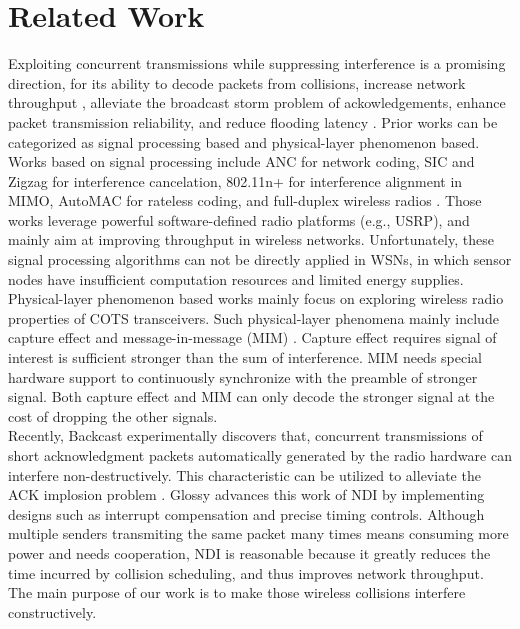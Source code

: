 \documentclass[conference]{IEEEtran}
\begin{document}
\section{Related Work}
\label{Sec_Relate}
\indent
Exploiting concurrent transmissions while suppressing interference is a promising direction, for its ability to decode packets from collisions, increase network throughput \cite{wang2010multicast,Capacity-INFOCOM12,chu2010opportunistic}, alleviate the broadcast storm problem of ackowledgements\cite{DuttaSensys10Backcast}, enhance packet transmission reliability, and reduce flooding latency \cite{ferrari11Glossy}.
Prior works can be categorized as signal processing based and physical-layer phenomenon based.\\
\indent Works based on signal processing include ANC \cite{katti2007embracing} for network coding, SIC \cite{halperin2008taking} and Zigzag \cite{gollakota2008zigzag} for interference cancelation, 802.11n+ \cite{lin2011random} for interference alignment in MIMO, AutoMAC \cite{Gudipati2012AutoMAC} for rateless coding, and full-duplex wireless radios \cite{jain2011practical}.
Those works leverage powerful software-defined radio platforms (e.g., USRP), and mainly aim at improving throughput in wireless networks.
Unfortunately, these signal processing algorithms can not be directly applied in WSNs, in which sensor nodes have insufficient computation resources and limited energy supplies.\\
\indent Physical-layer phenomenon based works mainly focus on exploring wireless radio properties of COTS transceivers.
Such physical-layer phenomena mainly include capture effect \cite{leentvaar1976captureeffect} and message-in-message (MIM) \cite{santhapuri2008message}.
Capture effect requires signal of interest is sufficient stronger than the sum of interference.
MIM needs special hardware support to continuously synchronize with the preamble of stronger signal.
Both capture effect and MIM can only decode the stronger signal at the cost of dropping the other signals.\\
\indent Recently, Backcast \cite{DuttaSensys10Backcast} experimentally discovers that, concurrent transmissions of short acknowledgment packets automatically generated by the radio hardware can interfere non-destructively.
This characteristic can be utilized to alleviate the ACK implosion problem \cite{ni1999broadcaststorm}.
Glossy \cite{ferrari11Glossy} advances this work of NDI by implementing designs such as interrupt compensation and precise timing controls.
Although multiple senders transmiting the same packet many times means consuming more power and needs cooperation, NDI is reasonable because it greatly reduces the time incurred by collision scheduling, and thus improves network throughput. The main purpose of our work is to make those wireless collisions interfere constructively. \\
\end{document}

